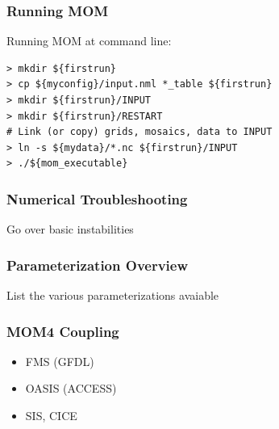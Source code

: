 \documentclass[red]{beamer}
\begin{document}
\begin{frame}[fragile]
    \frametitle{Running MOM}
    
    Running MOM at command line:
    \begin{lstlisting}
> mkdir ${firstrun}
> cp ${myconfig}/input.nml *_table ${firstrun}
> mkdir ${firstrun}/INPUT
> mkdir ${firstrun}/RESTART
# Link (or copy) grids, mosaics, data to INPUT
> ln -s ${mydata}/*.nc ${firstrun}/INPUT
> ./${mom_executable}
    \end{lstlisting}
\end{frame}

\begin{frame}
    \frametitle{Numerical Troubleshooting}

    Go over basic instabilities
\end{frame}

\begin{frame}
    \frametitle{Parameterization Overview}

    List the various parameterizations avaiable
\end{frame}

\begin{frame}
    \frametitle{MOM4 Coupling}

    \begin{itemize}
        \item FMS (GFDL)
        \item OASIS (ACCESS)
        \item SIS, CICE
    \end{itemize}
\end{frame}

\end{document}
